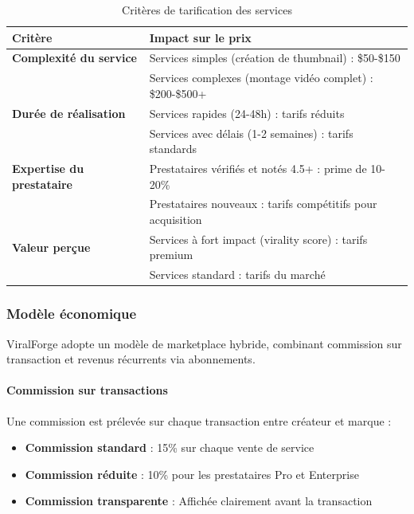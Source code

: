\begin{table}[H]
\centering
\caption{Critères de tarification des services}
\label{tab:criteres-tarification}
\begin{tabular}{|l|p{9cm}|}
\hline
\textbf{Critère} & \textbf{Impact sur le prix} \\
\hline
\textbf{Complexité du service} & Services simples (création de thumbnail) : \$50-\$150 \\
    & Services complexes (montage vidéo complet) : \$200-\$500+ \\
\hline
\textbf{Durée de réalisation} & Services rapides (24-48h) : tarifs réduits \\
    & Services avec délais (1-2 semaines) : tarifs standards \\
\hline
\textbf{Expertise du prestataire} & Prestataires vérifiés et notés 4.5+ : prime de 10-20\% \\
    & Prestataires nouveaux : tarifs compétitifs pour acquisition \\
\hline
\textbf{Valeur perçue} & Services à fort impact (virality score) : tarifs premium \\
    & Services standard : tarifs du marché \\
\hline
\end{tabular}
\end{table}

\subsubsection{Modèle économique}

ViralForge adopte un modèle de marketplace hybride, combinant commission sur transaction et revenus récurrents via abonnements.

\paragraph{Commission sur transactions}

Une commission est prélevée sur chaque transaction entre créateur et marque :
\begin{itemize}
    \item \textbf{Commission standard} : 15\% sur chaque vente de service
    \item \textbf{Commission réduite} : 10\% pour les prestataires Pro et Enterprise
    \item \textbf{Commission transparente} : Affichée clairement avant la transaction
\end{itemize}

